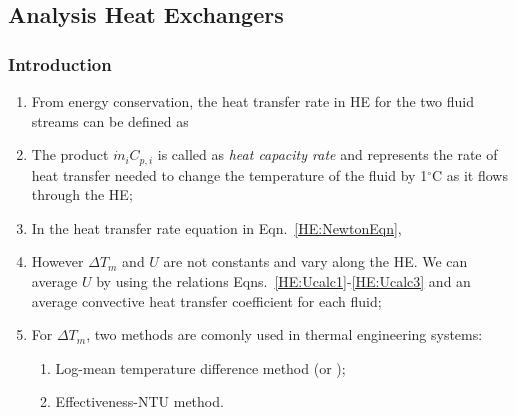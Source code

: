 \documentclass[10pt,compress,unknownkeysallowed]{beamer}
\begin{document}

\subsection{Analysis Heat Exchangers}

\begin{frame}
  \frametitle{Introduction}
     \begin{enumerate}%
          \item<1-> From energy conservation, the heat transfer rate in HE for the two fluid streams can be defined as
          \item<2-> The product $\dot{m}_{i}C_{p,i}$ is called as {\it heat capacity rate} and represents the rate of heat transfer needed to change the temperature of the fluid by 1$^{\circ}$C as it flows through the HE;
          \item<2-> In the heat transfer rate equation in Eqn.~\ref{HE:NewtonEqn},
          \item<3-> However $\Delta T_{m}$ and $U$ are not constants and vary along the HE. We can average $U$ by using the relations Eqns.~\ref{HE:Ucalc1}-\ref{HE:Ucalc3} and an average convective heat transfer coefficient for each fluid;
          \item<4-> For $\Delta T_{m}$, two methods are comonly used in thermal engineering systems:
             \begin{enumerate}
                \item<4-> Log-mean temperature difference method (or );
                \item<4-> Effectiveness-NTU method.
             \end{enumerate}
     \end{enumerate}

\end{frame}
\end{document}
